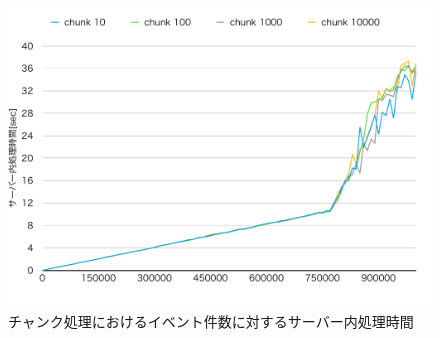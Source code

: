 \documentclass[../../../../../main]{subfiles}
\begin{document}
    \begin{figure}[H]
        \centering
        \includegraphics[width=12cm]{graph}
        \caption{チャンク処理におけるイベント件数に対するサーバー内処理時間}
        \label{fig:chunk-cpu-app_1_1024-db_1_1024}
    \end{figure}
\end{document}
